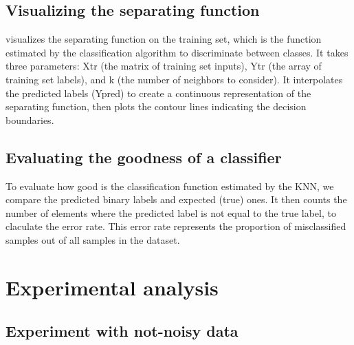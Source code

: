 \documentclass[a4paper,10pt,oneside]{article}
\begin{document}
\subsection{ Visualizing the separating function}
\label{ssec:subhead}
visualizes the separating function on the training set, which is the function estimated by the classification algorithm to discriminate between classes. It takes three parameters: Xtr (the matrix of training set inputs), Ytr (the array of training set labels), and k (the number of neighbors to consider).
It interpolates the predicted labels (Ypred) to create a continuous representation of the separating function, then plots the contour lines indicating the decision boundaries.

\subsection{ Evaluating the goodness of a classifier}
\label{ssec:subhead}
To evaluate how good is the classification function estimated by the KNN, 
we compare the predicted binary labels and expected (true) ones.
It then counts the number of elements where the predicted label is not equal 
to the true label, to claculate the error rate.
This error rate represents the proportion of misclassified samples out 
of all samples in the dataset.

\section{ Experimental analysis }
\label{sec:typestyle}

\subsection{ Experiment with not-noisy data }
\label{ssec:not-noisy}
\end{document}
